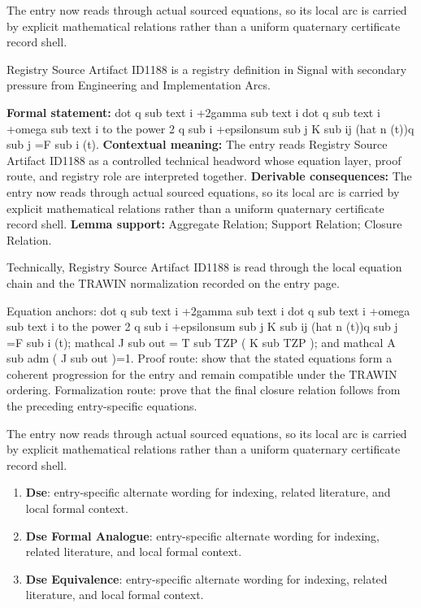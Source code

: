 The entry now reads through actual sourced equations, so its local arc is carried by explicit mathematical relations rather than a uniform quaternary certificate record shell.
\clearpage


\begingroup\small
{}
Registry Source Artifact ID1188 is a registry definition in Signal with secondary pressure from Engineering and Implementation Arcs.

\begingroup\footnotesize\setlength{\emergencystretch}{3em}\sloppy
\textbf{Formal statement:} dot q sub text i +2gamma sub text i dot q sub text i +omega sub text i to the power 2 q sub i +epsilonsum sub j K sub ij (hat n (t))q sub j =F sub i (t). \textbf{Contextual meaning:} The entry reads Registry Source Artifact ID1188 as a controlled technical headword whose equation layer, proof route, and registry role are interpreted together. \textbf{Derivable consequences:} The entry now reads through actual sourced equations, so its local arc is carried by explicit mathematical relations rather than a uniform quaternary certificate record shell. \textbf{Lemma support:} Aggregate Relation; Support Relation; Closure Relation.\par
\endgroup

Technically, Registry Source Artifact ID1188 is read through the local equation chain and the TRAWIN normalization recorded on the entry page.

Equation anchors: dot q sub text i +2gamma sub text i dot q sub text i +omega sub text i to the power 2 q sub i +epsilonsum sub j K sub ij (hat n (t))q sub j =F sub i (t); mathcal J sub out = T sub TZP ( K sub TZP ); and mathcal A sub adm ( J sub out )=1. Proof route: show that the stated equations form a coherent progression for the entry and remain compatible under the TRAWIN ordering. Formalization route: prove that the final closure relation follows from the preceding entry-specific equations.

The entry now reads through actual sourced equations, so its local arc is carried by explicit mathematical relations rather than a uniform quaternary certificate record shell.
\endgroup

\begin{enumerate}[leftmargin=1.6em,itemsep=6pt,topsep=4pt]
\item \textbf{Dse}: entry-specific alternate wording for indexing, related literature, and local formal context.
\item \textbf{Dse Formal Analogue}: entry-specific alternate wording for indexing, related literature, and local formal context.
\item \textbf{Dse Equivalence}: entry-specific alternate wording for indexing, related literature, and local formal context.
\end{enumerate}

